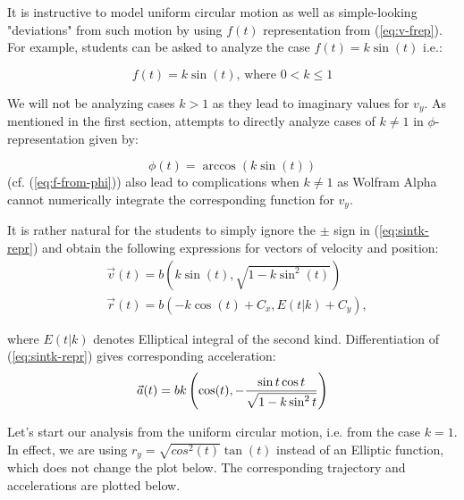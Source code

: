 \documentclass[journal]{IEEEtran}
\begin{document}
It is instructive to model uniform circular motion as well as simple-looking "deviations" from such motion by using $f(t)$ representation from (\ref{eq:v-frep}). For example, students can be asked to analyze the case $f(t)= k \sin (t) $ i.e.: 

\begin{equation}
f(t)= k \sin (t) \text{, where } 0 < k \leq 1
\label{eq:sintk-repr}
\end{equation}

We will not be analyzing cases $k>1$ as they lead to imaginary values for $v_y$. As mentioned in the first section, attempts to directly analyze cases of $k\ne 1$ in $\phi$-representation given by:

\begin{equation}
\phi(t)= \arccos \left( { k \sin (t) } \right)
\label{eq:sintk-phi-repr}
\end{equation}
(cf. (\ref{eq:f-from-phi})) also lead to complications when $k\ne 1$ as Wolfram Alpha cannot numerically integrate the corresponding function for $v_y$.

It is rather natural for the students to simply ignore the $\pm$ sign in (\ref{eq:sintk-repr}) and obtain the following expressions for vectors of velocity and position:
%
\begin{equation}
\begin{aligned}
&\vec{v}(t)=b\left( k \sin(t), {\sqrt{1-k\sin ^2(t)}} \right )
\\
&\vec{r}(t) = b \left( -{k \cos(t)}+C_x, E(t|k)+C_y \right),
\end{aligned}
\label{eq:sintk-vr-naive}
\end{equation}

where $E(t|k)$ denotes Elliptical integral of the second kind. Differentiation of (\ref{eq:sintk-repr}) gives corresponding acceleration:
\begin{equation}
\vec{a}(t) = bk \left( { \cos(t)}, - { {\sin t \cos t } \over  \sqrt{1 - k \sin ^2 t}} \right)
\label{eq:sintk-a}
\end{equation}


\par Let's start our analysis from the uniform circular motion, i.e. from the case $k=1$. In effect, we are using $r_y=\sqrt{cos^2(t)}\tan (t)$ instead of an Elliptic function, which does not change the plot below. The corresponding trajectory and accelerations are plotted below.
\end{document}
